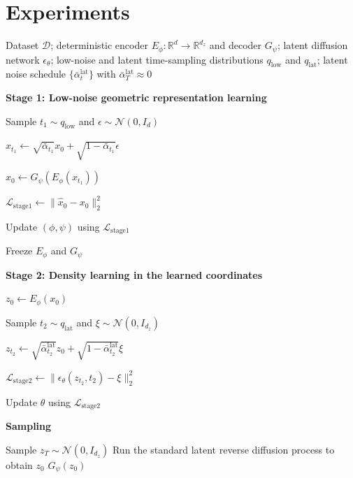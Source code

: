 \section{Experiments}
\label{sec:experiment}



\begin{algorithm}[h]
\caption{Practical Score-induced Latent Diffusion (SiLD)}
\label{alg:practical-sild}



\begin{algorithmic}[1]

\Require Dataset $\mathcal D$; deterministic encoder
$E_\phi:\mathbb R^d\to\mathbb R^{d_z}$ and decoder $G_\psi$;
latent diffusion network $\epsilon_\theta$;
low-noise and latent time-sampling distributions
$q_{\mathrm{low}}$ and $q_{\mathrm{lat}}$;
latent noise schedule $\{\bar\alpha_t^{\mathrm{lat}}\}$
with $\bar\alpha_T^{\mathrm{lat}}\approx 0$

\Statex \textbf{Stage 1: Low-noise geometric representation learning}

    \State Sample $t_1 \sim q_{\mathrm{low}}$ and
    $\epsilon \sim \mathcal N(0,I_d)$

    \State
    $x_{t_1} \gets
    \sqrt{\bar\alpha_{t_1}}x_0
    +
    \sqrt{1-\bar\alpha_{t_1}}\epsilon$

    \State
    $\hat{x}_0 \gets G_\psi(E_\phi(x_{t_1}))$

    \State
    $\mathcal L_{\mathrm{stage1}}
    \gets
    \lVert \hat{x}_0-x_0\rVert_2^2$

    \State Update $(\phi,\psi)$ using
    $\mathcal L_{\mathrm{stage1}}$
\EndFor

\State Freeze $E_\phi$ and $G_\psi$

\Statex \textbf{Stage 2: Density learning in the learned coordinates}

    \State $z_0 \gets E_\phi(x_0)$

    \State Sample $t_2 \sim q_{\mathrm{lat}}$ and
    $\xi \sim \mathcal N(0,I_{d_z})$

    \State
    $z_{t_2}
    \gets
    \sqrt{\bar\alpha_{t_2}^{\mathrm{lat}}}z_0
    +
    \sqrt{1-\bar\alpha_{t_2}^{\mathrm{lat}}}\xi$

    \State
    $\mathcal L_{\mathrm{stage2}}
    \gets
    \lVert
    \epsilon_\theta(z_{t_2},t_2)-\xi
    \rVert_2^2$

    \State Update $\theta$ using $\mathcal L_{\mathrm{stage2}}$
\EndFor

\Statex \textbf{Sampling}

\State Sample $z_T \sim \mathcal N(0,I_{d_z})$
\State Run the standard latent reverse diffusion process to obtain $z_0$
\State \Return $G_\psi(z_0)$

\end{algorithmic}
\end{algorithm}

